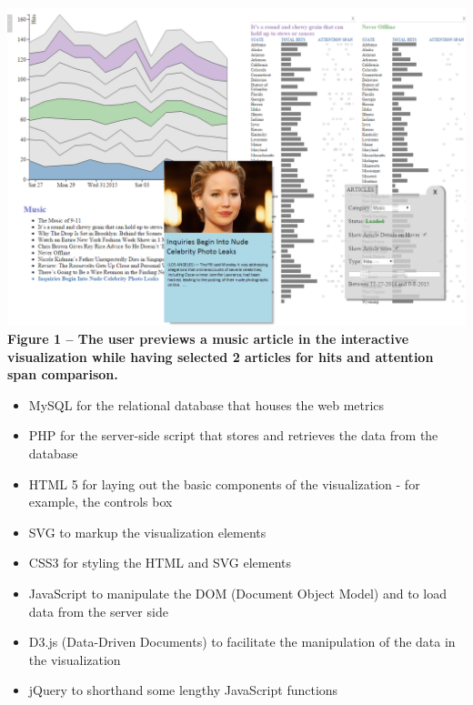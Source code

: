 \documentclass[12pt]{article}
\begin{document}
\noindent\includegraphics[scale=0.4]{img/in_action} \\

\noindent\textbf{Figure 1 -- The user previews a music article in the interactive visualization while having selected 2 articles for hits and attention span comparison.}


\newpage

\begin{itemize}
\item MySQL for the relational database that houses the web metrics
\item PHP for the server-side script that stores and retrieves the data from the database
\item HTML 5 for laying out the basic components of the visualization - for example, the controls box
\item SVG to markup the visualization elements
\item CSS3 for styling the HTML and SVG elements
\item JavaScript to manipulate the DOM (Document Object Model) and to load data from the server side
\item D3.js (Data-Driven Documents) to facilitate the manipulation of the data in the visualization
\item jQuery to shorthand some lengthy JavaScript functions
\end{itemize}


\end{document}
